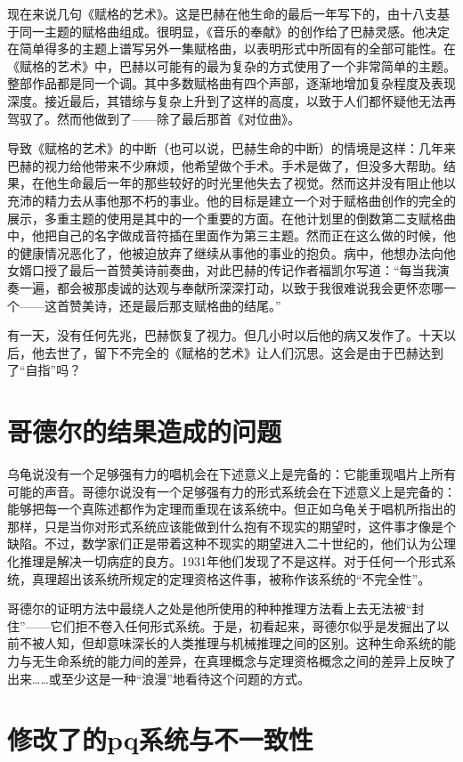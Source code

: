 现在来说几句《赋格的艺术》。这是巴赫在他生命的最后一年写下的，由十八支基于同一主题的赋格曲组成。很明显，《音乐的奉献》的创作给了巴赫灵感。他决定在简单得多的主题上谱写另外一集赋格曲，以表明形式中所固有的全部可能性。在《赋格的艺术》中，巴赫以可能有的最为复杂的方式使用了一个非常简单的主题。整部作品都是同一个调。其中多数赋格曲有四个声部，逐渐地增加复杂程度及表现深度。接近最后，其错综与复杂上升到了这样的高度，以致于人们都怀疑他无法再驾驭了。然而他做到了——除了最后那首《对位曲》。

导致《赋格的艺术》的中断（也可以说，巴赫生命的中断）的情境是这样：几年来巴赫的视力给他带来不少麻烦，他希望做个手术。手术是做了，但没多大帮助。结果，在他生命最后一年的那些较好的时光里他失去了视觉。然而这并没有阻止他以充沛的精力去从事他那不朽的事业。他的目标是建立一个对于赋格曲创作的完全的展示，多重主题的使用是其中的一个重要的方面。在他计划里的倒数第二支赋格曲中，他把自己的名字做成音符插在里面作为第三主题。然而正在这么做的时候，他的健康情况恶化了，他被迫放弃了继续从事他的事业的抱负。病中，他想办法向他女婿口授了最后一首赞美诗前奏曲，对此巴赫的传记作者福凯尔写道：“每当我演奏一遍，都会被那虔诚的达观与奉献所深深打动，以致于我很难说我会更怀恋哪一个——这首赞美诗，还是最后那支赋格曲的结尾。”

有一天，没有任何先兆，巴赫恢复了视力。但几小时以后他的病又发作了。十天以后，他去世了，留下不完全的《赋格的艺术》让人们沉思。这会是由于巴赫达到了“自指”吗？

\section{哥德尔的结果造成的问题}

乌龟说没有一个足够强有力的唱机会在下述意义上是完备的：它能重现唱片上所有可能的声音。哥德尔说没有一个足够强有力的形式系统会在下述意义上是完备的：能够把每一个真陈述都作为定理而重现在该系统中。但正如乌龟关于唱机所指出的那样，只是当你对形式系统应该能做到什么抱有不现实的期望时，这件事才像是个缺陷。不过，数学家们正是带着这种不现实的期望进入二十世纪的，他们认为公理化推理是解决一切病症的良方。1931年他们发现了不是这样。对于任何一个形式系统，真理超出该系统所规定的定理资格这件事，被称作该系统的“不完全性”。

哥德尔的证明方法中最绕人之处是他所使用的种种推理方法看上去无法被“封住”——它们拒不卷入任何形式系统。于是，初看起来，哥德尔似乎是发掘出了以前不被人知，但却意味深长的人类推理与机械推理之间的区别。这种生命系统的能力与无生命系统的能力间的差异，在真理概念与定理资格概念之间的差异上反映了出来……或至少这是一种“浪漫”地看待这个问题的方式。

\section{修改了的pq系统与不一致性}


